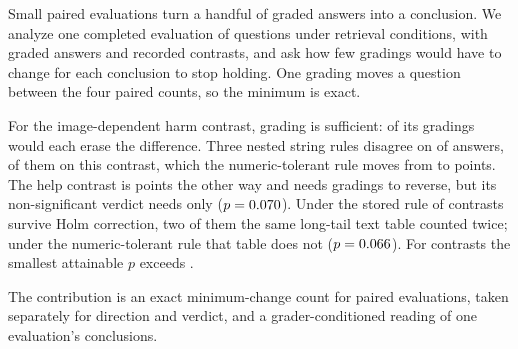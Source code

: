Small paired evaluations turn a handful of graded answers into a conclusion.
We analyze one completed evaluation of \Questions{} questions
under \ConditionsWord{} retrieval conditions, with \Answers{} graded answers
and \Contrasts{} recorded contrasts, and ask how few gradings
would have to change for each conclusion to stop holding.
One grading moves a question between the four paired counts, so the minimum
is exact.

For the image-dependent harm contrast, \HarmK{} grading is sufficient:
\HarmCandidates{} of its \HarmGradings{} gradings would each erase
the difference. Three nested string rules disagree on
\RegradeContested{} of \Answers{} answers, \RegradeImageFlip{} of them on this contrast,
which the numeric-tolerant rule moves from \HarmDiff{} to \RegradedDiff{}
points. The help contrast is \HelpDiff{} points the other way
and needs \HelpK{} gradings to reverse, but its non-significant verdict needs
only \HelpVerdictK{} (\(p=0.070{}\)). Under the stored rule \SurvivesHolm{}
of \Contrasts{} contrasts survive Holm correction, two of them the same
long-tail text table counted twice; under the numeric-tolerant rule that
table does not (\(p=0.066{}\)). For \Incapable{} contrasts the
smallest attainable \(p\) exceeds \AlphaLevel{}.

The contribution is an exact minimum-change count for paired evaluations,
taken separately for direction and verdict, and a grader-conditioned reading
of one evaluation's conclusions.
